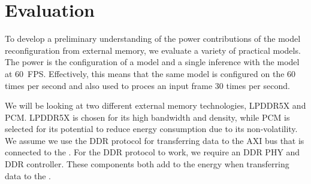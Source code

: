\section{Evaluation}
To develop a preliminary understanding of the power contributions of the model reconfiguration from external memory, we evaluate a variety of practical models.
The power is the configuration of a model and a single inference with the model at \SI{60}{FPS}.
Effectively, this means that the same model is configured on the \graicore{} 60 times per second and also used to proces an input frame 30 times per second.

We will be looking at two different external memory technologies, LPDDR5X and PCM.
LPDDR5X is chosen for its high bandwidth and density, while PCM is selected for its potential to reduce energy consumption due to its non-volatility.
We assume we use the DDR protocol for transferring data to the AXI bus that is connected to the \graicore{}.
For the DDR protocol to work, we require an DDR PHY and DDR controller.
These components both add to the energy when transferring data to the \graicore{}.

